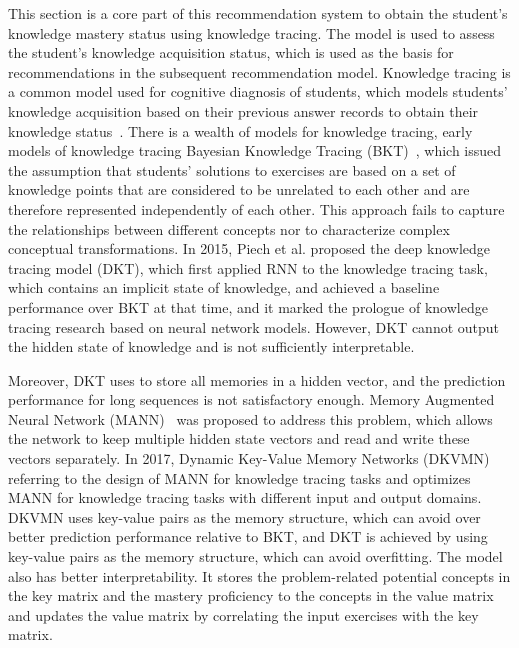 This section is a core part of this recommendation system to obtain the student's knowledge mastery status using knowledge tracing. The model is used to assess the student's knowledge acquisition status, which is used as the basis for recommendations in the subsequent recommendation model. Knowledge tracing is a common model used for cognitive diagnosis of students, which models students' knowledge acquisition based on their previous answer records to obtain their knowledge status~\cite{gonzalez2014general}. There is a wealth of models for knowledge tracing, early models of knowledge tracing Bayesian Knowledge Tracing (BKT)~\cite{yudelson2013individualized}, which issued the assumption that students' solutions to exercises are based on a set of knowledge points that are considered to be unrelated to each other and are therefore represented independently of each other. This approach fails to capture the relationships between different concepts nor to characterize complex conceptual transformations. In 2015, Piech et al. proposed the deep knowledge tracing model (DKT), which first applied RNN to the knowledge tracing task, which contains an implicit state of knowledge, and achieved a baseline performance over BKT at that time, and it marked the prologue of knowledge tracing research based on neural network models. However, DKT cannot output the hidden state of knowledge and is not sufficiently interpretable.

Moreover, DKT uses to store all memories in a hidden vector, and the prediction performance for long sequences is not satisfactory enough. Memory Augmented Neural Network (MANN)~\cite{santoro2016meta} was proposed to address this problem, which allows the network to keep multiple hidden state vectors and read and write these vectors separately. In 2017, Dynamic Key-Value Memory Networks (DKVMN)~\cite{zhang2017dynamic} referring to the design of MANN for knowledge tracing tasks and optimizes MANN for knowledge tracing tasks with different input and output domains. DKVMN uses key-value pairs as the memory structure, which can avoid over better prediction performance relative to BKT, and DKT is achieved by using key-value pairs as the memory structure, which can avoid overfitting. The model also has better interpretability. It stores the problem-related potential concepts in the key matrix and the mastery proficiency to the concepts in the value matrix and updates the value matrix by correlating the input exercises with the key matrix.

